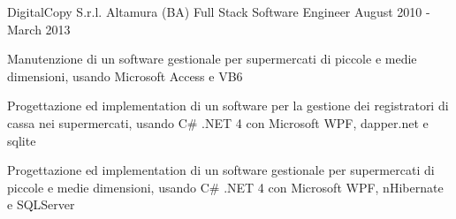 \documentclass{resume} %
\begin{document}

\cvEntry
  {DigitalCopy S.r.l.}
  {Altamura (BA)}
  {Full Stack Software Engineer}
  {August 2010 - March 2013}{
    \begin{cvEntryItems}
      \item Manutenzione di un software gestionale per supermercati di piccole e medie
            dimensioni, usando Microsoft Access e VB6
      \item Progettazione ed implementation di un software per la gestione dei registratori
            di cassa nei supermercati, usando C\# .NET 4 con Microsoft WPF, dapper.net e sqlite
      \item Progettazione ed implementation di un software gestionale per supermercati di
            piccole e medie dimensioni, usando C\# .NET 4 con Microsoft WPF, nHibernate e SQLServer
    \end{cvEntryItems}
}



\end{document}
